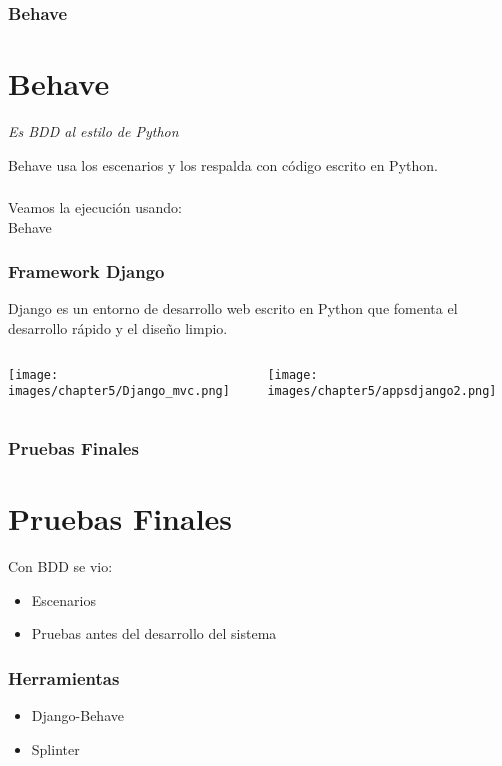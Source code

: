 \documentclass{beamer}
\begin{document}
\begin{frame}
  \frametitle{Behave}
  \section{Behave}
  \begin{center}
    {\it Es BDD al estilo de Python}
  \end{center}
  Behave usa los escenarios y los respalda con c\'odigo escrito en Python.
\end{frame}

\begin{frame}
  \frametitle{}
  \begin{center}
    Veamos la ejecuci\'on usando:\\
    \vspace{1cm}
    {\huge Behave}
  \end{center}
\end{frame}

\begin{frame}
  \frametitle{Framework Django}
  Django es un entorno de desarrollo web escrito en Python que fomenta el
  desarrollo rápido y el diseño limpio.
  \begin{columns}

      \texttt{[image: images/chapter5/Django\_mvc.png]}

      \texttt{[image: images/chapter5/appsdjango2.png]}
  \end{columns}
\end{frame}

\begin{frame}
  \frametitle{Pruebas Finales}
  \section{Pruebas Finales}
  Con BDD se vio:
  \begin{itemize}
      \item Escenarios
      \item Pruebas antes del desarrollo del sistema
  \end{itemize}
\end{frame}

\begin{frame}
  \frametitle{Herramientas}
  \begin{itemize}
      \item Django-Behave
      \item Splinter
  \end{itemize}
\end{frame}
\end{document}
